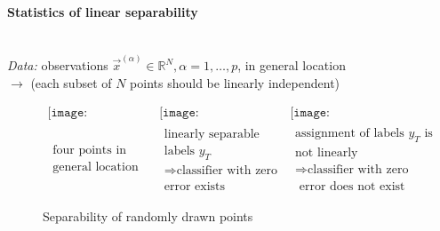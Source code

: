 \paragraph{Statistics of linear separability} \mbox{}\\
\emph{Data:} observations $\vec{x}^{(\alpha)} \in \mathbb{R}^N, \alpha = 1, \ldots, p$, in general location\\
$\rightarrow$ (each subset of $N$ points should be linearly independent)
\begin{figure}[h]
  \centering
  \[ \begin{array}{lcl}
	\texttt{[image: section2\_fig5]}
	& \texttt{[image: section2\_fig6]}
	& \texttt{[image: section2\_fig7]} \\
	\substack{ \text{four points in} \\ \text{general location} }
	& \substack{ \text{linearly separable assignment of} \\
			\text{labels } y_T \\
			\Rightarrow \text{classifier with zero training} \\
			\text{error exists} }
	& \substack{ \text{assignment of labels } y_T \text{ is} \\
			\text{not linearly separable} \\
			\Rightarrow \text{classifier with zero training} \\
			\text{ error does not exist} }
\end{array} \]
  \caption{Separability of randomly drawn points}
\end{figure}

